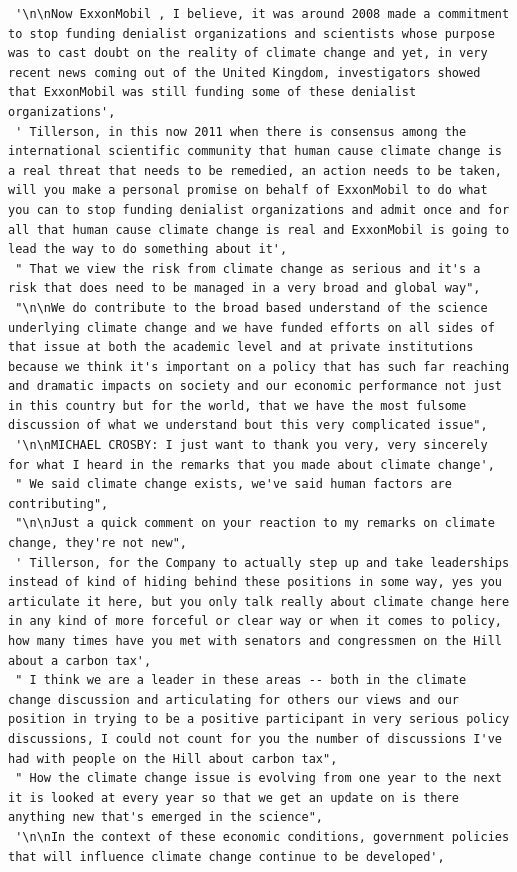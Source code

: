 \documentclass[
  letterpaper,
  DIV=11,
  numbers=noendperiod]{scrreprt}
\begin{document}
\begin{verbatim}
 '\n\nNow ExxonMobil , I believe, it was around 2008 made a commitment to stop funding denialist organizations and scientists whose purpose was to cast doubt on the reality of climate change and yet, in very recent news coming out of the United Kingdom, investigators showed that ExxonMobil was still funding some of these denialist organizations',
 ' Tillerson, in this now 2011 when there is consensus among the international scientific community that human cause climate change is a real threat that needs to be remedied, an action needs to be taken, will you make a personal promise on behalf of ExxonMobil to do what you can to stop funding denialist organizations and admit once and for all that human cause climate change is real and ExxonMobil is going to lead the way to do something about it',
 " That we view the risk from climate change as serious and it's a risk that does need to be managed in a very broad and global way",
 "\n\nWe do contribute to the broad based understand of the science underlying climate change and we have funded efforts on all sides of that issue at both the academic level and at private institutions because we think it's important on a policy that has such far reaching and dramatic impacts on society and our economic performance not just in this country but for the world, that we have the most fulsome discussion of what we understand bout this very complicated issue",
 '\n\nMICHAEL CROSBY: I just want to thank you very, very sincerely for what I heard in the remarks that you made about climate change',
 " We said climate change exists, we've said human factors are contributing",
 "\n\nJust a quick comment on your reaction to my remarks on climate change, they're not new",
 ' Tillerson, for the Company to actually step up and take leaderships instead of kind of hiding behind these positions in some way, yes you articulate it here, but you only talk really about climate change here in any kind of more forceful or clear way or when it comes to policy, how many times have you met with senators and congressmen on the Hill about a carbon tax',
 " I think we are a leader in these areas -- both in the climate change discussion and articulating for others our views and our position in trying to be a positive participant in very serious policy discussions, I could not count for you the number of discussions I've had with people on the Hill about carbon tax",
 " How the climate change issue is evolving from one year to the next it is looked at every year so that we get an update on is there anything new that's emerged in the science",
 '\n\nIn the context of these economic conditions, government policies that will influence climate change continue to be developed',

\end{verbatim}
\end{document}
